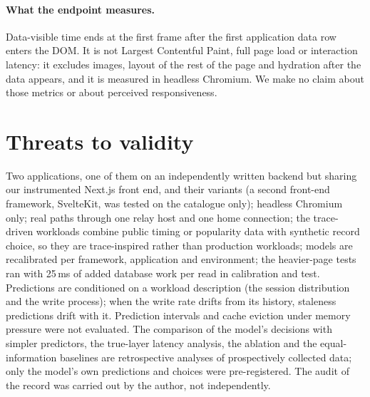 \documentclass[acmsmall,review,nonacm]{acmart}
\begin{document}
\paragraph{What the endpoint measures.}
Data-visible time ends at the first frame after the first application data row enters the DOM. It is not Largest Contentful Paint, full page load or interaction latency: it excludes images, layout of the rest of the page and hydration after the data appears, and it is measured in headless Chromium. We make no claim about those metrics or about perceived responsiveness.

\section{Threats to validity}
Two applications, one of them on an independently written backend but sharing our instrumented Next.js front end, and their variants (a second front-end framework, SvelteKit, was tested on the catalogue only); headless Chromium only; real paths through one relay host and one home connection; the trace-driven workloads combine public timing or popularity data with synthetic record choice, so they are trace-inspired rather than production workloads; models are recalibrated per framework, application and environment; the heavier-page tests ran with 25\,ms of added database work per read in calibration and test. Predictions are conditioned on a workload description (the session distribution and the write process); when the write rate drifts from its history, staleness predictions drift with it. Prediction intervals and cache eviction under memory pressure were not evaluated. The comparison of the model's decisions with simpler predictors, the true-layer latency analysis, the ablation and the equal-information baselines are retrospective analyses of prospectively collected data; only the model's own predictions and choices were pre-registered. The audit of the record was carried out by the author, not independently.

\end{document}
